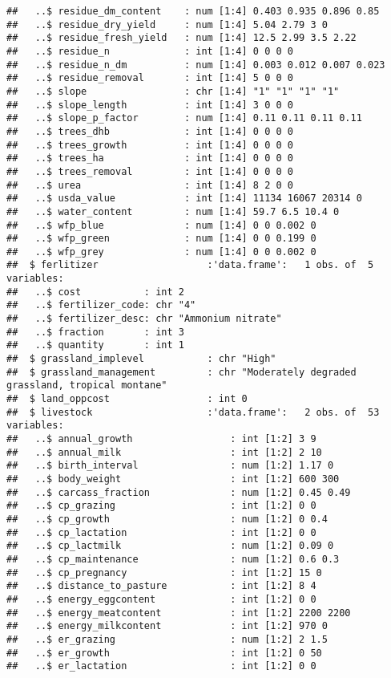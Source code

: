 \documentclass[
]{article}
\begin{document}
\begin{verbatim}
##   ..$ residue_dm_content    : num [1:4] 0.403 0.935 0.896 0.85
##   ..$ residue_dry_yield     : num [1:4] 5.04 2.79 3 0
##   ..$ residue_fresh_yield   : num [1:4] 12.5 2.99 3.5 2.22
##   ..$ residue_n             : int [1:4] 0 0 0 0
##   ..$ residue_n_dm          : num [1:4] 0.003 0.012 0.007 0.023
##   ..$ residue_removal       : int [1:4] 5 0 0 0
##   ..$ slope                 : chr [1:4] "1" "1" "1" "1"
##   ..$ slope_length          : int [1:4] 3 0 0 0
##   ..$ slope_p_factor        : num [1:4] 0.11 0.11 0.11 0.11
##   ..$ trees_dhb             : int [1:4] 0 0 0 0
##   ..$ trees_growth          : int [1:4] 0 0 0 0
##   ..$ trees_ha              : int [1:4] 0 0 0 0
##   ..$ trees_removal         : int [1:4] 0 0 0 0
##   ..$ urea                  : int [1:4] 8 2 0 0
##   ..$ usda_value            : int [1:4] 11134 16067 20314 0
##   ..$ water_content         : num [1:4] 59.7 6.5 10.4 0
##   ..$ wfp_blue              : num [1:4] 0 0 0.002 0
##   ..$ wfp_green             : num [1:4] 0 0 0.199 0
##   ..$ wfp_grey              : num [1:4] 0 0 0.002 0
##  $ ferlitizer                   :'data.frame':   1 obs. of  5 variables:
##   ..$ cost           : int 2
##   ..$ fertilizer_code: chr "4"
##   ..$ fertilizer_desc: chr "Ammonium nitrate"
##   ..$ fraction       : int 3
##   ..$ quantity       : int 1
##  $ grassland_implevel           : chr "High"
##  $ grassland_management         : chr "Moderately degraded grassland, tropical montane"
##  $ land_oppcost                 : int 0
##  $ livestock                    :'data.frame':   2 obs. of  53 variables:
##   ..$ annual_growth                 : int [1:2] 3 9
##   ..$ annual_milk                   : int [1:2] 2 10
##   ..$ birth_interval                : num [1:2] 1.17 0
##   ..$ body_weight                   : int [1:2] 600 300
##   ..$ carcass_fraction              : num [1:2] 0.45 0.49
##   ..$ cp_grazing                    : int [1:2] 0 0
##   ..$ cp_growth                     : num [1:2] 0 0.4
##   ..$ cp_lactation                  : int [1:2] 0 0
##   ..$ cp_lactmilk                   : num [1:2] 0.09 0
##   ..$ cp_maintenance                : num [1:2] 0.6 0.3
##   ..$ cp_pregnancy                  : int [1:2] 15 0
##   ..$ distance_to_pasture           : int [1:2] 8 4
##   ..$ energy_eggcontent             : int [1:2] 0 0
##   ..$ energy_meatcontent            : int [1:2] 2200 2200
##   ..$ energy_milkcontent            : int [1:2] 970 0
##   ..$ er_grazing                    : num [1:2] 2 1.5
##   ..$ er_growth                     : int [1:2] 0 50
##   ..$ er_lactation                  : int [1:2] 0 0

\end{verbatim}
\end{document}
